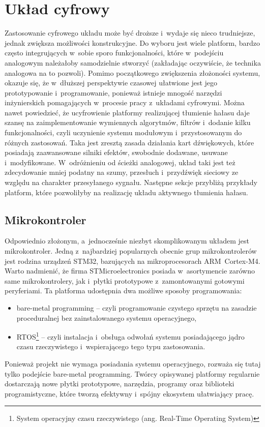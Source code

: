 \section{Układ cyfrowy}
\label{sec:digital}
Zastosowanie cyfrowego układu może być droższe i~wydaje się nieco trudniejsze, jednak zwiększa możliwości konstrukcyjne. Do wyboru jest wiele platform, bardzo często integrujących w~sobie sporo funkcjonalności, które w~podejściu analogowym należałoby samodzielnie stworzyć (zakładając oczywiście, że technika analogowa na to pozwoli).  Pomimo początkowego zwiększenia złożoności systemu, okazuje się, że w~dłuższej perspektywie czasowej ułatwione jest jego prototypowanie i~programowanie, ponieważ istnieje mnogość narzędzi inżynierskich pomagających w~procesie pracy z~układami cyfrowymi. Można nawet powiedzieć, że ucyfrowienie platformy realizującej tłumienie hałasu daje szansę na zaimplementowanie wymiennych algorytmów, filtrów i~dodanie kilku funkcjonalności, czyli uczynienie systemu modułowym i~przystosowanym do różnych zastosowań. Taka jest zresztą zasada działania kart dźwiękowych, które posiadają zaawansowane silniki efektów, swobodnie dodawane, usuwane i~modyfikowane. W~odróżnieniu od ścieżki analogowej, układ taki jest też zdecydowanie mniej podatny na szumy, przesłuch i~przydźwięk sieciowy ze względu na charakter przesyłanego sygnału. Następne sekcje przybliżą przykłady platform, które pozwoliłyby na realizację układu aktywnego tłumienia hałasu.
\subsection{Mikrokontroler}
\label{uC}
Odpowiednio złożonym, a~jednocześnie niezbyt skomplikowanym układem jest mikrokontroler. Jedną z~najbardziej popularnych obecnie grup mikrokontrolerów jest rodzina urządzeń STM32, bazujących na mikroprocesorach ARM~Cortex-M4. Warto nadmienić, że firma STMicroelectronics posiada w~asortymencie zarówno same mikrokontrolery, jak i~płytki prototypowe z~zamontowanymi gotowymi peryferiami. Ta platforma udostępnia dwa możliwe sposoby programowania:
\begin{itemize}
	\item bare-metal programming -- czyli programowanie czystego sprzętu na zasadzie proceduralnej bez zainstalowanego systemu operacyjnego,
	\item RTOS\footnote{System operacyjny czasu rzeczywistego (ang. Real-Time Operating System)} -- czyli instalacja i~obsługa odwołań systemu posiadającego jądro czasu rzeczywistego i~wspierającego tego typu zastosowania.
\end{itemize}
Ponieważ projekt nie wymaga posiadania systemu operacyjnego, rozważa się tutaj tylko podejście bare-metal programming. Twórcy opisywanej platformy regularnie dostarczają nowe płytki prototypowe, narzędzia, programy oraz biblioteki programistyczne, które tworzą efektywny i~spójny ekosystem ułatwiający pracę.
